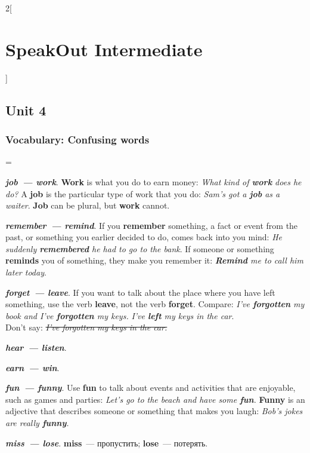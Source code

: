 \documentclass[10pt,a4paper]{article}
\newlength{\OriginalParIndent}
\newcommand\ex[1]{\textit{\textbf{{#1}}}}           %
\begin{document}
\begin{multicols}{2}[\section{SpeakOut Intermediate}]
\subsection{Unit 4}
\subsubsection{Vocabulary: Confusing words}

\begingroup
\parindent=\OriginalParIndent

\ex{job~--- work}. \textbf{Work} is what you do to earn money: \textit{What kind of \ex{work} does he do?}
A \textbf{job} is the particular type of work that you do: \textit{Sam's got a \ex{job} as a waiter}.
\textbf{Job} can be plural, but \textbf{work} cannot.

\ex{remember~--- remind}. If you \textbf{remember} something, a fact or event from the past,
or something you earlier decided to do, comes back into you mind:
\textit{He suddenly \ex{remembered} he had to go to the bank}. If someone or something \textbf{reminds} you
of something, they make you remember it:
\textit{\ex{Remind} me to call him later today}.


\ex{forget~--- leave}. If you want to talk about the place where you have left something, use the
verb \textbf{leave}, not the verb \textbf{forget}. Compare: \textit{I've \ex{forgotten} my book and I've
\ex{forgotten} my keys.} \textit{I've \ex{left} my keys in the car}.\\
Don't say: \textit{\sout{I've forgotten my keys in the car.}}

\ex{hear~--- listen}.

\ex{earn~--- win}.

\ex{fun~--- funny}. Use \textbf{fun} to talk about events and activities that are enjoyable, such as
games and parties: \textit{Let's go to the beach and have some \ex{fun}.} \textbf{Funny} is an adjective
that describes someone or something that makes you laugh: \textit{Bob's jokes are really \ex{funny}.}

\ex{miss~--- lose}. \textbf{miss}~--- пропустить; \textbf{lose}~--- потерять.

\endgroup



\end{multicols}
\end{document}
